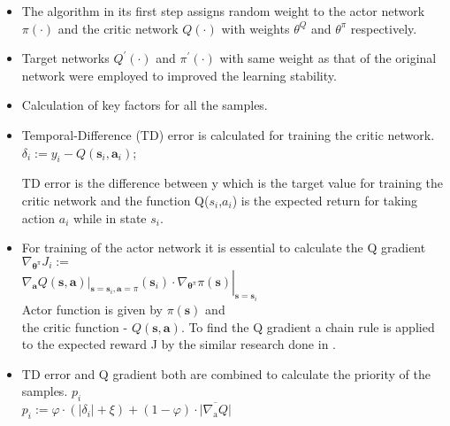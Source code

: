 \begin{itemize}
\item The algorithm in its first step assigns random weight to the actor network $\pi(\cdot)$ and the critic network $Q(\cdot)$ with weights $\theta^{Q}$ and $\theta^{\pi}$ respectively. 
\item Target networks $Q^{\prime}(\cdot)$ and 
$\pi^{\prime}(\cdot)$ with same weight as that of the original network were employed to improved the learning stability.
\item Calculation of key factors for all the samples.
\item  Temporal-Difference (TD) error is calculated for training the  critic network. \\
$\delta_{i}:=y_{i}-Q\left(\mathbf{s}_{i}, \mathbf{a}_{i}\right)$;

TD error is the difference between y which is the target value for training the critic network and the function Q(${s}_{i}$,${a}_{i}$) is the expected return for taking action ${a}_{i}$ while in state ${s}_{i}$.

\item For training of the actor network it is essential to calculate the Q gradient $\nabla_{\boldsymbol{\theta}^{\pi}} J_{i}:=$ \\
$\left.\left.\nabla_{\mathbf{a}} Q(\mathbf{s}, \mathbf{a})\right|_{\mathbf{s}=\mathbf{s}_{i}, \mathbf{a}=\pi}\left(\mathbf{s}_{i}\right) \cdot \nabla_{\boldsymbol{\theta}^{\pi}} \pi(\mathbf{s})\right|_{\mathbf{s}=\mathbf{s}_{i}}$ \\

Actor function is given by $\pi(\mathbf{s})$ and \\
the critic function - $Q(\mathbf{s}, \mathbf{a})$.
To find the Q gradient a chain rule is applied to the expected reward J by the similar research done in    \cite{low_Lapsley:_handb_Flowcontrol}.  
\item TD error and Q gradient both are combined to calculate the priority of the samples. $p_{i}$ \\
$p_{i}:=\varphi \cdot\left(\left|\delta_{i}\right|+\xi\right)+(1-\varphi) \cdot \overline{\left|\nabla_{\mathrm{a}} Q\right|}$ \\


\end{itemize}
